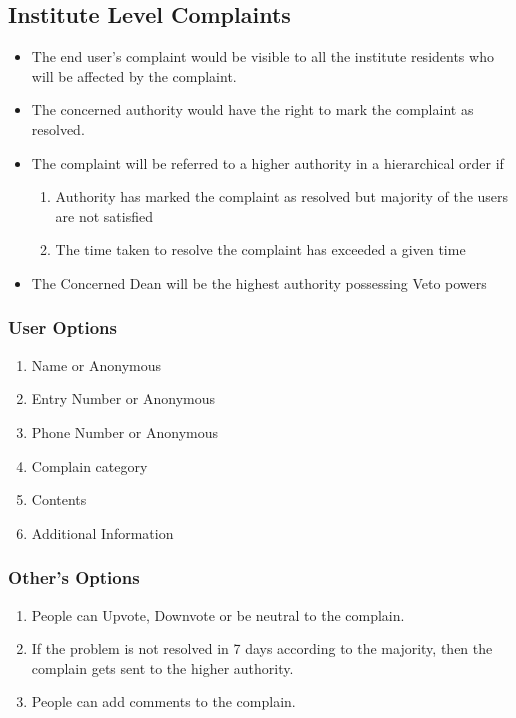 \documentclass{article}
\begin{document}
		\subsection{Institute Level Complaints}
		\begin{itemize}
		\item The end user's complaint would be visible to all the institute residents who will be affected by the complaint.
		\item The concerned authority would have the right to mark the complaint as resolved.
		\item The complaint will be referred to a higher authority in a hierarchical order if 
			\begin{enumerate}
			\item Authority has marked the complaint as resolved but majority of the users are not satisfied
			\item The time taken to resolve the complaint has exceeded a given time 
			\end{enumerate}
		\item The Concerned Dean will be the highest authority possessing Veto powers 
		\end{itemize}
			\subsubsection{User Options}
				\begin{enumerate}
					\item Name or Anonymous
					\item Entry Number or Anonymous 
					\item Phone Number or Anonymous
					\item Complain category
					\item Contents
					\item Additional Information
				\end{enumerate}
			\subsubsection{Other's Options}
				\begin{enumerate}
					\item People can Upvote, Downvote or be neutral to the complain.
					\item If the problem is not resolved in 7 days according to the majority, then the complain gets sent to the higher authority.
					\item People can add comments to the complain.
				\end{enumerate}
\end{document}
